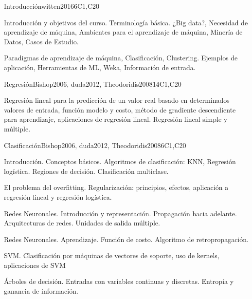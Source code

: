 \begin{syllabus}
\begin{competences}
    \item {}
\end{competences}

\begin{unit}{Introducción}{}{witten2016}{6}{C1,C20}
\begin{topics}
      \item Introducción y objetivos del curso. Terminología básica. ¿Big data?, Necesidad de aprendizaje de máquina, Ambientes para el aprendizaje de máquina, Minería de Datos, Casos de Estudio. 
      \item Paradigmas de aprendizaje de máquina, Clasificación, Clustering. Ejemplos de aplicación, Herramientas de ML, Weka, Información de entrada.
   \end{topics}

\end{unit}

\begin{unit}{Regresión}{}{Bishop2006, duda2012, Theodoridis2008}{14}{C1,C20}
\begin{topics}
      \item Regresión lineal para la predicción de un valor real basado en determinados valores de entrada, función modelo y costo, método de gradiente descendiente para aprendizaje, aplicaciones de regresión lineal. Regresión lineal simple y múltiple.
    \end{topics}

\end{unit}

\begin{unit}{Clasificación}{}{Bishop2006, duda2012, Theodoridis2008}{6}{C1,C20}
\begin{topics}
      \item Introducción. Conceptos básicos. Algoritmos de clasificación: KNN, Regresión logística. Regiones de decisión. Clasificación multiclase.
      \item El problema del overfitting. Regularización: principios, efectos, aplicación a regresión lineal y regresión logística.
      \item Redes Neuronales. Introducción y representación. Propagación hacia adelante. Arquitecturas de redes. Unidades de salida múltiple.
      \item Redes Neuronales. Aprendizaje. Función de costo. Algoritmo de retropropagación.
      \item SVM. Clasificación por máquinas de vectores de soporte, uso de kernels, aplicaciones de SVM
      \item Árboles de decisión. Entradas con variables continuas y discretas. Entropía y ganancia de información.


\end{topics}
\end{unit}
\end{syllabus}
